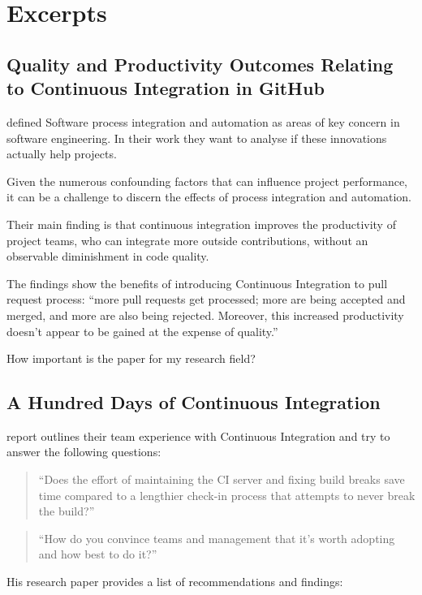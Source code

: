 \section*{Excerpts}

\subsection*{Quality and Productivity Outcomes Relating to Continuous Integration in GitHub}

\textcite[]{Vasilescu2015} defined Software process integration and automation as areas of key concern in software engineering. In their work they want to analyse if these innovations actually help projects. 

Given the numerous confounding factors that can influence project performance, it can be a challenge to discern the effects of process integration and automation. \autocite[p. 2]{Vasilescu2015}

Their main finding is that continuous integration improves the productivity of project teams, who can integrate more outside contributions, without an observable diminishment in code quality. \autocite[]{Vasilescu2015}

The findings show the benefits of introducing Continuous Integration to pull request process: ``more pull requests get processed; more are being accepted and merged, and more are also being rejected. Moreover, this increased productivity doesn't appear to be gained at the expense of quality.''\autocite[]{Vasilescu2015}

How important is the paper for my research field?

\subsection*{A Hundred Days of Continuous Integration}

\textcite[]{Miller2008} report outlines their team experience with Continuous Integration and try to answer the following questions:
\begin{quote}
``Does the effort of maintaining the CI server and fixing build breaks save time compared to a lengthier check-in process that attempts to never break the build?'' \autocite[]{Miller2008}
\end{quote}
\begin{quote}
``How do you convince teams and management that it's worth adopting and how best to do it?'' \autocite[]{Miller2008}
\end{quote}
His research paper provides a list of recommendations and findings:

